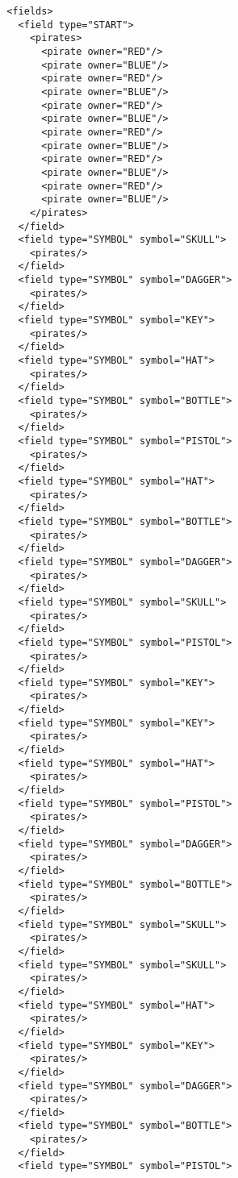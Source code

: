 \documentclass[12pt,a4paper, ngerman, oneside]{scrartcl}
\begin{document}
\begin{enumerate}
\begin{verbatim}
        <fields>
          <field type="START">
            <pirates>
              <pirate owner="RED"/>
              <pirate owner="BLUE"/>
              <pirate owner="RED"/>
              <pirate owner="BLUE"/>
              <pirate owner="RED"/>
              <pirate owner="BLUE"/>
              <pirate owner="RED"/>
              <pirate owner="BLUE"/>
              <pirate owner="RED"/>
              <pirate owner="BLUE"/>
              <pirate owner="RED"/>
              <pirate owner="BLUE"/>
            </pirates>
          </field>
          <field type="SYMBOL" symbol="SKULL">
            <pirates/>
          </field>
          <field type="SYMBOL" symbol="DAGGER">
            <pirates/>
          </field>
          <field type="SYMBOL" symbol="KEY">
            <pirates/>
          </field>
          <field type="SYMBOL" symbol="HAT">
            <pirates/>
          </field>
          <field type="SYMBOL" symbol="BOTTLE">
            <pirates/>
          </field>
          <field type="SYMBOL" symbol="PISTOL">
            <pirates/>
          </field>
          <field type="SYMBOL" symbol="HAT">
            <pirates/>
          </field>
          <field type="SYMBOL" symbol="BOTTLE">
            <pirates/>
          </field>
          <field type="SYMBOL" symbol="DAGGER">
            <pirates/>
          </field>
          <field type="SYMBOL" symbol="SKULL">
            <pirates/>
          </field>
          <field type="SYMBOL" symbol="PISTOL">
            <pirates/>
          </field>
          <field type="SYMBOL" symbol="KEY">
            <pirates/>
          </field>
          <field type="SYMBOL" symbol="KEY">
            <pirates/>
          </field>
          <field type="SYMBOL" symbol="HAT">
            <pirates/>
          </field>
          <field type="SYMBOL" symbol="PISTOL">
            <pirates/>
          </field>
          <field type="SYMBOL" symbol="DAGGER">
            <pirates/>
          </field>
          <field type="SYMBOL" symbol="BOTTLE">
            <pirates/>
          </field>
          <field type="SYMBOL" symbol="SKULL">
            <pirates/>
          </field>
          <field type="SYMBOL" symbol="SKULL">
            <pirates/>
          </field>
          <field type="SYMBOL" symbol="HAT">
            <pirates/>
          </field>
          <field type="SYMBOL" symbol="KEY">
            <pirates/>
          </field>
          <field type="SYMBOL" symbol="DAGGER">
            <pirates/>
          </field>
          <field type="SYMBOL" symbol="BOTTLE">
            <pirates/>
          </field>
          <field type="SYMBOL" symbol="PISTOL">

\end{verbatim}
\end{enumerate}
\end{document}
